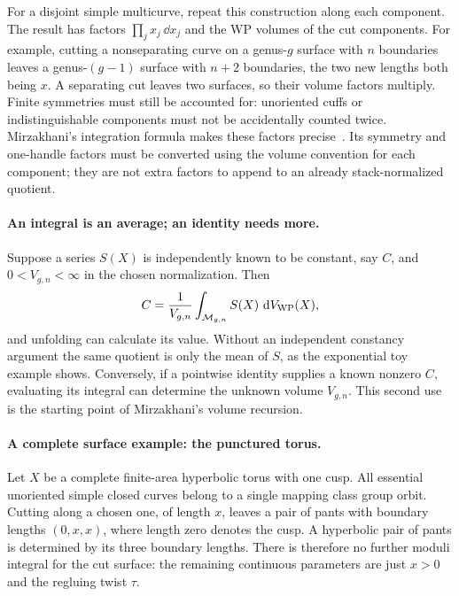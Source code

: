 For a disjoint simple multicurve, repeat this construction
along each component. The result has factors
$\prod_j x_j\,\dd x_j$ and the WP volumes of the cut components.
For example, cutting a nonseparating curve on a genus-$g$
surface with $n$ boundaries leaves a genus-$(g-1)$ surface
with $n+2$ boundaries, the two new lengths both being $x$.
A separating cut leaves two surfaces, so their volume factors
multiply. Finite symmetries must still be accounted for:
unoriented cuffs or indistinguishable components must not be
accidentally counted twice. Mirzakhani's integration formula
makes these factors precise~\cite[Theorem 7.1 and Lemma 7.3]{MirzVolumes}.
Its symmetry and one-handle factors must be converted using
the volume convention for each component; they are not extra
factors to append to an already stack-normalized quotient.

\paragraph{An integral is an average; an identity needs more.}
Suppose a series $S(X)$ is independently known to be constant,
say $C$, and $0<V_{g,n}<\infty$ in the chosen normalization.
Then
\begin{equation}
 C=\frac{1}{V_{g,n}}
       \int_{\mathcal M_{g,n}}S(X)\,\mathop{}\!\mathrm d V_{\mathrm{WP}}(X),
 \label{eq:recoverconstant}
\end{equation}
and unfolding can calculate its value. Without an independent
constancy argument the same quotient is only the mean of $S$,
as the exponential toy example shows. Conversely, if a pointwise
identity supplies a known nonzero $C$, evaluating its integral
can determine the unknown volume $V_{g,n}$. This second use is
the starting point of Mirzakhani's volume recursion.

\paragraph{A complete surface example: the punctured torus.}
Let $X$ be a complete finite-area hyperbolic torus with one cusp.
All essential unoriented simple closed curves belong to a
single mapping class group orbit. Cutting along a chosen one,
of length $x$, leaves a pair of pants with boundary lengths
$(0,x,x)$, where length zero denotes the cusp. A hyperbolic
pair of pants is determined by its three boundary lengths.
There is therefore no further moduli integral for the cut
surface: the remaining continuous parameters are just $x>0$
and the regluing twist $\tau$.

